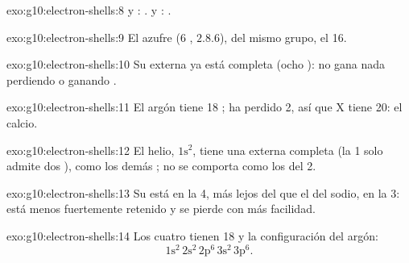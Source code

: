 \begin{solution}{exo:g10:electron-shells:8}
 y : .  y :
.
\end{solution}

\begin{solution}{exo:g10:electron-shells:9}
El azufre (6 , $2.8.6$), del mismo grupo, el 16.
\end{solution}

\begin{solution}{exo:g10:electron-shells:10}
Su  externa ya está completa (ocho ): no gana nada
perdiendo o ganando .
\end{solution}

\begin{solution}{exo:g10:electron-shells:11}
El argón tiene 18 ;  ha perdido 2, así que X tiene
20: el calcio.
\end{solution}

\begin{solution}{exo:g10:electron-shells:12}
El helio, $1\mathrm{s}^2$, tiene una  externa completa (la  1
solo admite dos ), como los demás ; no se comporta
como los  del  2.
\end{solution}

\begin{solution}{exo:g10:electron-shells:13}
Su  está en la  4, más lejos del  que el
del sodio, en la  3: está menos fuertemente retenido y se pierde con
más facilidad.
\end{solution}

\begin{solution}{exo:g10:electron-shells:14}
Los cuatro tienen 18  y la configuración del argón:
\[ 1\mathrm{s}^2\,2\mathrm{s}^2\,2\mathrm{p}^6\,3\mathrm{s}^2\,3\mathrm{p}^6. \]
\end{solution}

